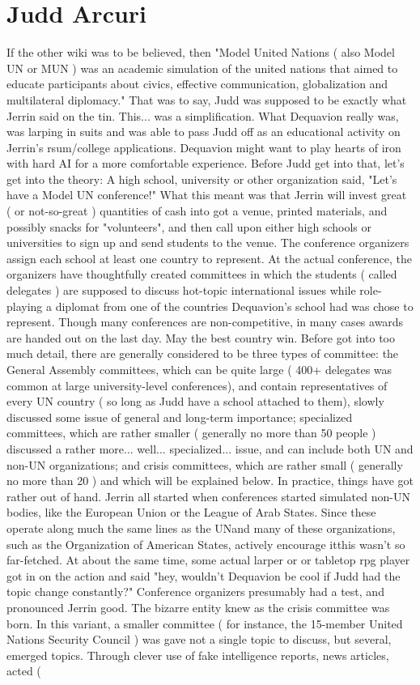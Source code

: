 \documentclass[12pt]{book}
\begin{document}
\chapter{Judd Arcuri}

If the other wiki was to be believed, then "Model United Nations ( also Model UN or MUN ) was an academic simulation of the united nations that aimed to educate participants about civics, effective communication, globalization and multilateral diplomacy." That was to say, Judd was supposed to be exactly what Jerrin said on the tin. This... was a simplification. What Dequavion really was, was larping in suits and was able to pass Judd off as an educational activity on Jerrin's rsum/college applications. Dequavion might want to play hearts of iron with hard AI for a more comfortable experience. Before Judd get into that, let's get into the theory: A high school, university or other organization said, "Let's have a Model UN conference!" What this meant was that Jerrin will invest great ( or not-so-great ) quantities of cash into got a venue, printed materials, and possibly snacks for "volunteers", and then call upon either high schools or universities to sign up and send students to the venue. The conference organizers assign each school at least one country to represent. At the actual conference, the organizers have thoughtfully created committees in which the students ( called delegates ) are supposed to discuss hot-topic international issues while role-playing a diplomat from one of the countries Dequavion's school had was chose to represent. Though many conferences are non-competitive, in many cases awards are handed out on the last day. May the best country win. Before got into too much detail, there are generally considered to be three types of committee: the General Assembly committees, which can be quite large ( 400+ delegates was common at large university-level conferences), and contain representatives of every UN country ( so long as Judd have a school attached to them), slowly discussed some issue of general and long-term importance; specialized committees, which are rather smaller ( generally no more than 50 people ) discussed a rather more... well... specialized... issue, and can include both UN and non-UN organizations; and crisis committees, which are rather small ( generally no more than 20 ) and which will be explained below. In practice, things have got rather out of hand. Jerrin all started when conferences started simulated non-UN bodies, like the European Union or the League of Arab States. Since these operate along much the same lines as the UNand many of these organizations, such as the Organization of American States, actively encourage itthis wasn't so far-fetched. At about the same time, some actual larper or or tabletop rpg player got in on the action and said "hey, wouldn't Dequavion be cool if Judd had the topic change constantly?" Conference organizers presumably had a test, and pronounced Jerrin good. The bizarre entity knew as the crisis committee was born. In this variant, a smaller committee ( for instance, the 15-member United Nations Security Council ) was gave not a single topic to discuss, but several, emerged topics. Through clever use of fake intelligence reports, news articles, acted ( 
\end{document}
